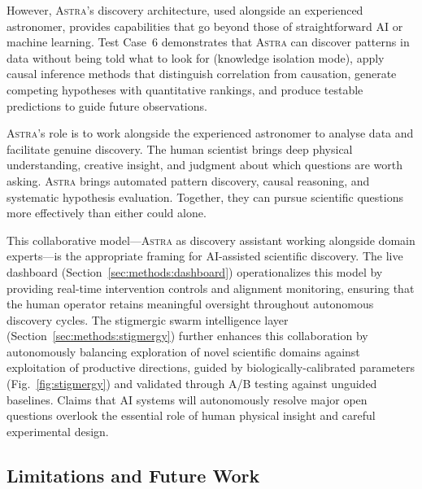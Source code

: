 \documentclass[usenatbib]{rasti}
\newcommand{\astra}{\textsc{Astra}\xspace}
\begin{document}
However, \astra's discovery architecture, used alongside an experienced astronomer, provides capabilities that go beyond those of straightforward AI or machine learning.
Test Case~6 demonstrates that \astra can discover patterns in data without being told what to look for (knowledge isolation mode), apply causal inference methods that distinguish correlation from causation, generate competing hypotheses with quantitative rankings, and produce testable predictions to guide future observations.

\astra's role is to work alongside the experienced astronomer to analyse data and facilitate genuine discovery.
The human scientist brings deep physical understanding, creative insight, and judgment about which questions are worth asking.
\astra brings automated pattern discovery, causal reasoning, and systematic hypothesis evaluation.
Together, they can pursue scientific questions more effectively than either could alone.

This collaborative model---\astra as discovery assistant working alongside domain experts---is the appropriate framing for AI-assisted scientific discovery.
The live dashboard (Section~\ref{sec:methods:dashboard}) operationalizes this model by providing real-time intervention controls and alignment monitoring, ensuring that the human operator retains meaningful oversight throughout autonomous discovery cycles.
The stigmergic swarm intelligence layer (Section~\ref{sec:methods:stigmergy}) further enhances this collaboration by autonomously balancing exploration of novel scientific domains against exploitation of productive directions, guided by biologically-calibrated parameters (Fig.~\ref{fig:stigmergy}) and validated through A/B testing against unguided baselines.
Claims that AI systems will autonomously resolve major open questions overlook the essential role of human physical insight and careful experimental design.

\subsection{Limitations and Future Work}
\label{sec:discussion:limitations}
\end{document}
